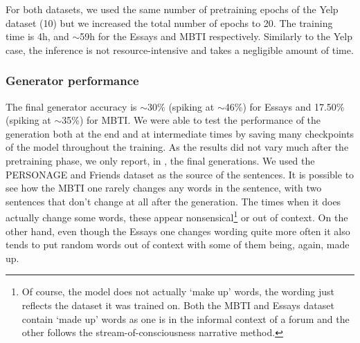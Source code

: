 \documentclass[nomenclature, english, biblatex]{kththesis}
\begin{document}
For both datasets, we used the same number of pretraining epochs of the Yelp dataset (10) but we increased the total number of epochs to 20. The training time is 4h, and $\sim$59h for the Essays and MBTI respectively. Similarly to the Yelp case, the inference is not resource-intensive and takes a negligible amount of time.
\subsubsection{Generator performance}
The final generator accuracy is $\sim$30\% (spiking at $\sim$46\%) for Essays and 17.50\% (spiking at $\sim$35\%) for MBTI. We were able to test the performance of the generation both at the end and at intermediate times by saving many checkpoints of the model throughout the training. As the results did not vary much after the pretraining phase, we only report, in , the final generations. We used the PERSONAGE and Friends dataset as the source of the sentences. It is possible to see how the MBTI one rarely changes any words in the sentence, with two sentences that don't change at all after the generation. The times when it does actually change some words, these appear nonsensical\footnote{Of course, the model does not actually `make up' words, the wording just reflects the dataset it was trained on. Both the MBTI and Essays dataset contain `made up' words as one is in the informal context of a forum and the other follows the stream-of-consciousness narrative method.} or out of context. On the other hand, even though the Essays one changes wording quite more often it also tends to put random words out of context with some of them being, again, made up.
\end{document}
